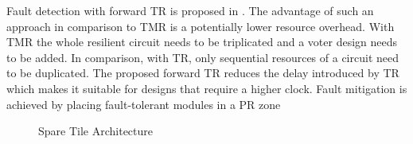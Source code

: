 Fault detection with forward \gls{TR} is proposed in \cite{frenkel2015}.
The advantage of such an approach in comparison to \gls{TMR} is a potentially lower resource overhead.
With \gls{TMR} the whole resilient circuit needs to be triplicated and a voter design needs to be added.
In comparison, with \gls{TR}, only sequential resources of a circuit need to be duplicated.
The proposed forward \gls{TR} reduces the delay introduced by \gls{TR} which makes it suitable for designs that require a higher clock. 
Fault mitigation is achieved by placing fault-tolerant modules in a \gls{PR} zone  

\begin{center}
\begin{figure}[h]
    \centering
    \resizebox{\columnwidth}{!} {
        
    }
\caption{Spare Tile Architecture}
\label{fig:SpareTileArchitecture}
\end{figure}
\end{center}
